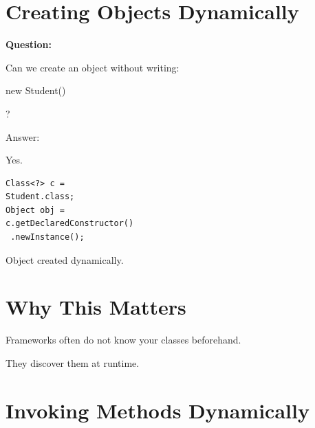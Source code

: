 \documentclass[11pt,a4paper]{book}
\begin{document}

\section{Creating Objects Dynamically}

\textbf{Question:}


Can we create an object
without writing:

new Student()

?


Answer:


Yes.


\begin{verbatim} 
Class<?> c =
Student.class;
Object obj =
c.getDeclaredConstructor()
 .newInstance();
\end{verbatim}


Object created dynamically.


\section{Why This Matters}

Frameworks often do not know
your classes beforehand.


They discover them at runtime.


\section{Invoking Methods Dynamically}
\end{document}
